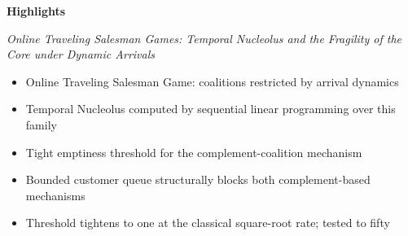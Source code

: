 \documentclass[11pt]{article}
\begin{document}
\noindent\textbf{Highlights}

\medskip

\noindent\emph{Online Traveling Salesman Games: Temporal Nucleolus and the Fragility of the Core under Dynamic Arrivals}

\medskip

\begin{itemize}[leftmargin=*, itemsep=0.3ex]
  \item Online Traveling Salesman Game: coalitions restricted by arrival dynamics
  \item Temporal Nucleolus computed by sequential linear programming over this family
  \item Tight emptiness threshold for the complement-coalition mechanism
  \item Bounded customer queue structurally blocks both complement-based mechanisms
  \item Threshold tightens to one at the classical square-root rate; tested to fifty
\end{itemize}
\end{document}
